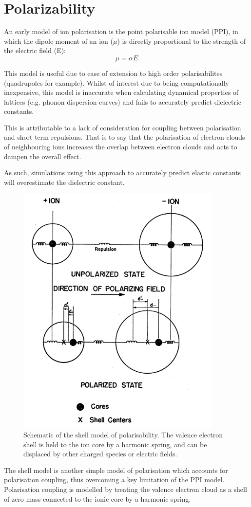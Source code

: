 \section{Polarizability}

An early model of ion polarisation is the point polarisable ion model (PPI), in which the dipole moment of an ion ($\mu$) is directly proportional to the strength of the electric field (E):
\begin{equation}
\mu = \alpha E
\end{equation}

This model is useful due to ease of extension to high order polarisabilites (quadrupoles for example).
Whilst of interest due to being computationally inexpensive, this model is inaccurate when calculating dynamical properties of lattices (e.g. phonon dispersion curves) and fails to accurately predict dielectric constants.

This is attributable to a lack of consideration for coupling between polarisation and short term repulsions. That is to say that the polarisation of electron clouds of neighbouring ions increases the overlap between electron clouds and acts to dampen the overall effect.

As such, simulations using this approach to accurately predict elastic constants will overestimate the dielectric constant.

\begin{figure}[ht]
  \centering
  \includegraphics[width=0.4\linewidth]{figures/shell}
  \caption[Schematic of the shell model of polarisability.\cite{Dick1958}]{Schematic of the shell model of polarisability.\cite{Dick1958} The valence electron shell is held to the ion core by a harmonic spring, and can be displaced by other charged species or electric fields.}
\end{figure}
The shell model\cite{Dick1958} is another simple model of polarisation which accounts for polarisation coupling, thus overcoming a key limitation of the PPI model.
Polarisation coupling is modelled by treating the valence electron cloud as a shell of zero mass connected to the ionic core by a harmonic spring.

